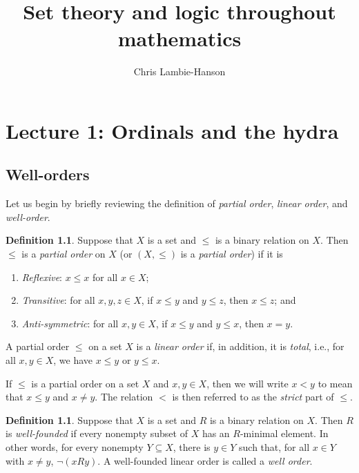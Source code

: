 \documentclass[a4paper]{memoir}
\theoremstyle{definition}
\newtheorem{definition}[theorem]{Definition}
\begin{document}
\frontmatter
\title{Set theory and logic throughout mathematics}
\author{Chris Lambie-Hanson}
\maketitle

\clearpage

\tableofcontents

\mainmatter



\chapter{Lecture 1: Ordinals and the hydra}

\section{Well-orders}

Let us begin by briefly reviewing the definition of \emph{partial order}, 
\emph{linear order}, and \emph{well-order}.

\begin{definition} \label{def: poset}
  Suppose that $X$ is a set and $\leq$ is a binary relation on $X$. Then $\leq$ is a \emph{partial order} 
  on $X$ (or $(X, \leq)$ is a \emph{partial order}) if it is
  \begin{enumerate}
    \item \emph{Reflexive}: $x \leq x$ for all $x \in X$;
    \item \emph{Transitive}: for all $x,y,z \in X$, if $x \leq y$ and $y \leq z$, then $x \leq z$; and
    \item \emph{Anti-symmetric}: for all $x,y \in X$, if $x \leq y$ and $y \leq x$, then $x = y$.
  \end{enumerate}
  A partial order $\leq$ on a set $X$ is a \emph{linear order} if, in addition, it is \emph{total}, i.e., 
  for all $x,y \in X$, we have $x \leq y$ or $y \leq x$.
\end{definition}

If $\leq$ is a partial order on a set $X$ and $x,y \in X$, then we will write $x < y$ to mean that 
$x \leq y$ and $x \neq y$. The relation $<$ is then referred to as the \emph{strict} part of 
$\leq$.

\begin{definition}
  Suppose that $X$ is a set and $R$ is a binary relation on $X$. Then $R$ is \emph{well-founded} if 
  every nonempty subset of $X$ has an $R$-minimal element. In other words, for every nonempty 
  $Y \subseteq X$, there is $y \in Y$ such that, for all $x \in Y$ with $x \neq y$, 
  $\neg (x R y)$. A well-founded linear order is called a \emph{well order}.
\end{definition}
\end{document}
